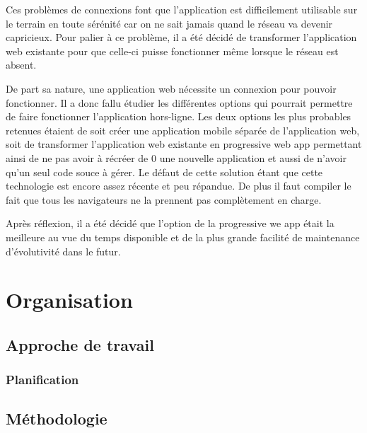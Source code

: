 \documentclass{EPL-master-thesis-covers-FR}
\begin{document}
		Ces problèmes de connexions font que l'application est difficilement utilisable sur le terrain en toute sérénité car on ne sait jamais quand le réseau va devenir capricieux. Pour palier à ce problème, il a été décidé de transformer l'application web existante pour que celle-ci puisse fonctionner même lorsque le réseau est absent.
				
				De part sa nature, une application web nécessite un connexion pour pouvoir fonctionner. Il a donc fallu étudier les différentes options qui pourrait permettre de faire fonctionner l'application hors-ligne. Les deux options les plus probables retenues étaient de soit créer une application mobile séparée de l'application web, soit de transformer l'application web existante en progressive web app permettant ainsi de ne pas avoir à récréer de 0 une nouvelle application et aussi de n'avoir qu'un seul code souce à gérer. Le défaut de cette solution étant que cette technologie est encore assez récente et peu répandue. De plus il faut compiler le fait que tous les navigateurs ne la prennent pas complètement en charge. 
				
				Après réflexion, il a été décidé que l'option de la progressive we app était la meilleure au vue du temps disponible et de la plus grande facilité de maintenance d'évolutivité dans le futur.

	\chapter{Organisation}
		


		\section{Approche de travail}


			\subsection*{Planification}
				\label{sec:planification}

		\section{Méthodologie}

\end{document}
